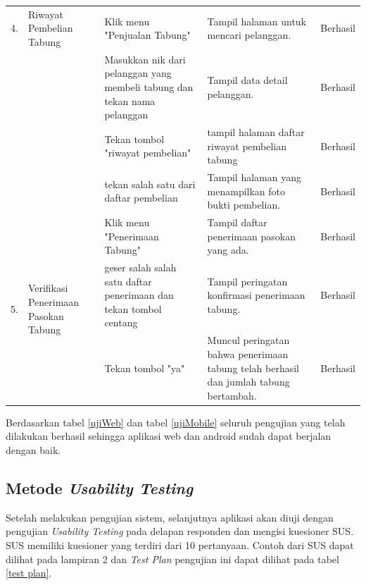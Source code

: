 \begin{longtable}{ |c|p{3cm}|p{3cm}|p{3cm}|p{2cm}|}
		\multirow{1}{*}{4.}  & 	\multirow{1}{*}{\parbox{3cm}{\centering Riwayat Pembelian Tabung}} & Klik menu "Penjualan Tabung"          & Tampil halaman untuk mencari pelanggan.             & Berhasil \\ \cline{3-5}
		 \multirow{3}{*}{} & \multirow{3}{*}{} & Masukkan nik dari pelanggan yang membeli tabung dan tekan nama pelanggan           & Tampil data detail pelanggan.             & Berhasil \\ \cline{3-5}
		& & Tekan tombol "riwayat pembelian"           & tampil halaman daftar riwayat pembelian tabung & Berhasil
		\\ \cline{3-5}
		& & tekan salah satu dari daftar pembelian           & Tampil halaman yang menampilkan foto bukti pembelian.             & Berhasil \\ \hline
	
		
		
		\multirow{3}{*}{5.}  & 	\multirow{3}{*}{\parbox{3cm}{\centering Verifikasi Penerimaan Pasokan Tabung}} & Klik menu "Penerimaan Tabung"           & Tampil daftar penerimaan pasokan yang ada.             & Berhasil \\ \hline
		& & geser salah salah satu daftar penerimaan dan tekan tombol centang           & Tampil peringatan konfirmasi penerimaan tabung.             & Berhasil \\ \cline{3-5}
		& & Tekan tombol "ya"           & Muncul peringatan bahwa penerimaan tabung telah berhasil dan jumlah tabung bertambah.             & Berhasil \\ \hline
		
	\end{longtable}

	Berdasarkan tabel \ref{ujiWeb} dan tabel \ref{ujiMobile} seluruh pengujian yang telah dilakukan berhasil sehingga aplikasi web dan android sudah dapat berjalan dengan baik. 
	
	\subsection{Metode \textit{Usability Testing}}
	
	Setelah melakukan pengujian sistem, selanjutnya aplikasi akan diuji dengan pengujian \textit{Usability Testing} pada delapan responden dan mengisi kuesioner SUS. SUS memiliki kuesioner yang terdiri dari 10 pertanyaan. Contoh dari SUS dapat dilihat pada lampiran 2 dan \textit{Test Plan} pengujian ini dapat dilihat pada tabel \ref{test plan}.
	

